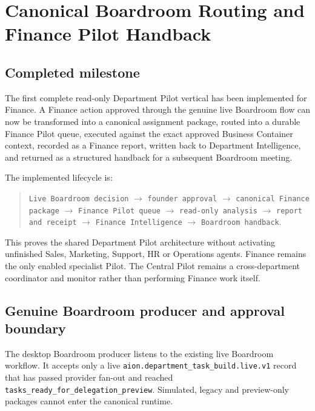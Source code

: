 \section{Canonical Boardroom Routing and Finance Pilot Handback}
\label{sec:aion-boardroom-finance-pilot-handback}

\subsection{Completed milestone}

The first complete read-only Department Pilot vertical has been implemented for Finance.  A Finance action approved through the genuine live Boardroom flow can now be transformed into a canonical assignment package, routed into a durable Finance Pilot queue, executed against the exact approved Business Container context, recorded as a Finance report, written back to Department Intelligence, and returned as a structured handback for a subsequent Boardroom meeting.

The implemented lifecycle is:
\begin{quote}
\texttt{Live Boardroom decision}
$\rightarrow$ \texttt{founder approval}
$\rightarrow$ \texttt{canonical Finance package}
$\rightarrow$ \texttt{Finance Pilot queue}
$\rightarrow$ \texttt{read-only analysis}
$\rightarrow$ \texttt{report and receipt}
$\rightarrow$ \texttt{Finance Intelligence}
$\rightarrow$ \texttt{Boardroom handback}.
\end{quote}

This proves the shared Department Pilot architecture without activating unfinished Sales, Marketing, Support, HR or Operations agents.  Finance remains the only enabled specialist Pilot.  The Central Pilot remains a cross-department coordinator and monitor rather than performing Finance work itself.

\subsection{Genuine Boardroom producer and approval boundary}

The desktop Boardroom producer listens to the existing live Boardroom workflow.  It accepts only a live \texttt{aion.department\_task\_build.live.v1} record that has passed provider fan-out and reached \texttt{tasks\_ready\_for\_delegation\_preview}.  Simulated, legacy and preview-only packages cannot enter the canonical runtime.

